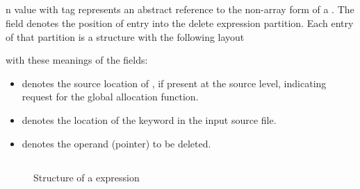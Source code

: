 

\subsection{}
\label{sec:ifc:ExprSort:Delete}

n  value with tag  represents an abstract 
reference to the non-array form of a .  The  field 
denotes the position of entry into the delete expression partition.  Each entry of
that partition is a structure with the following layout
%
\begin{figure}[H]
	\centering
\end{figure}
%
with these meanings of the fields:
\begin{itemize}
	\item {} denotes the source location of \code{::}, if present at the source level, indicating request for the global allocation function.
	\item {} denotes the location of the  keyword in the input source file.
	\item {} denotes the operand (pointer) to be deleted.
\end{itemize}



\subsection{}
\label{sec:ifc:ExprSort:Typeid}

\begin{figure}[H]
	\centering
	\caption{Structure of a  expression}
	\label{fig:ifc-typeid-structure}
\end{figure}


